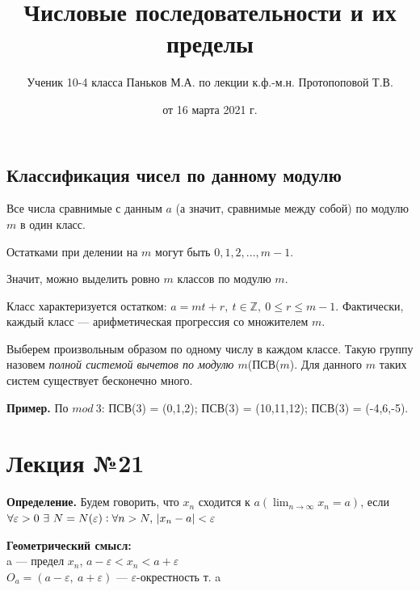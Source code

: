 \documentclass{article}
\begin{document}
    \subsection{Классификация чисел по данному модулю}
    
    Все числа сравнимые с данным \(a\) (а значит, сравнимые между собой) по модулю \(m\) в один класс.

    Остатками при делении на \(m\) могут быть \(0,1,2,...,m - 1\).

    Значит, можно выделить ровно \(m\) классов по модулю \(m\).

    Класс характеризуется остатком: \( a = mt + r,\ t \in \mathbb{Z},\ 0 \leq r \leq m - 1 \). Фактически, каждый класс --- арифметическая прогрессия со множителем \(m\).

    Выберем произвольным образом по одному числу в каждом классе. Такую группу назовем \textit{полной системой вычетов по модулю \(m\)}(ПСВ(\(m\)). Для данного \(m\) таких систем существует бесконечно много.

    \textbf{Пример.} По \(mod\ 3\): ПСВ(3) = (0,1,2); ПСВ(3) = (10,11,12); ПСВ(3) = (-4,6,-5).
    

\title{Числовые последовательности и их пределы}
\author{Ученик 10-4 класса Паньков М.А. по лекции к.ф.-м.н. Протопоповой Т.В.}
\date{от 16 марта 2021 г.}
\maketitle

\section{Лекция №21}

\textbf{Определение.} Будем говорить, что \( x_n \) сходится к \( a(\lim_{n \to \infty} x_n = a) \), если \( \forall \varepsilon > 0 \ \exists \  N = N(\varepsilon): \forall n > N,\ \abs{x_n - a} < \varepsilon \)

\textbf{Геометрический смысл:}\\
a --- предел \( x_n \), \(a - \varepsilon < x_n < a + \varepsilon\)\\
\(O_a = (a - \varepsilon,\ a + \varepsilon)\) --- \(\varepsilon\)-окрестность т. a
\end{document}
